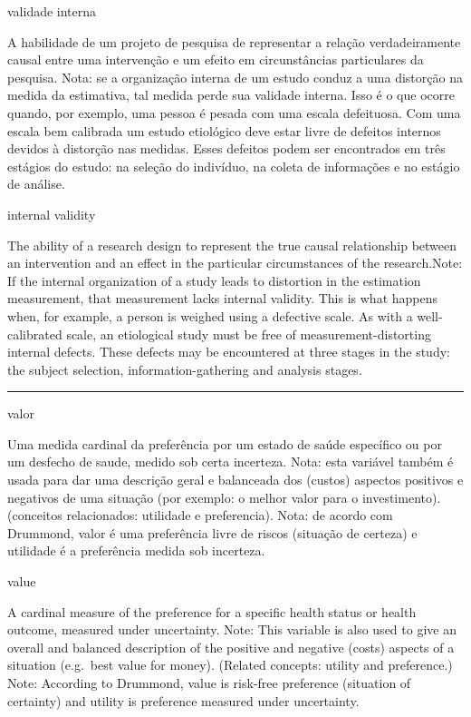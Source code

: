 \documentclass[
  openany]{book}
\begin{document}
validade interna

A habilidade de um projeto de pesquisa de representar a relação verdadeiramente causal entre uma intervenção e um efeito em circunstâncias particulares da pesquisa. Nota: se a organização interna de um estudo conduz a uma distorção na medida da estimativa, tal medida perde sua validade interna. Isso é o que ocorre quando, por exemplo, uma pessoa é pesada com uma escala defeituosa. Com uma escala bem calibrada um estudo etiológico deve estar livre de defeitos internos devidos à distorção nas medidas. Esses defeitos podem ser encontrados em três estágios do estudo: na seleção do indivíduo, na coleta de informações e no estágio de análise.

internal validity

The ability of a research design to represent the true causal relationship between an intervention and an effect in the particular circumstances of the research.Note: If the internal organization of a study leads to distortion in the estimation measurement, that measurement lacks internal validity. This is what happens when, for example, a person is weighed using a defective scale. As with a well-calibrated scale, an etiological study must be free of measurement-distorting internal defects. These defects may be encountered at three stages in the study: the subject selection, information-gathering and analysis stages.

\begin{center}\rule{0.5\linewidth}{0.5pt}\end{center}

valor

Uma medida cardinal da preferência por um estado de saúde específico ou por um desfecho de saude, medido sob certa incerteza. Nota: esta variável também é usada para dar uma descrição geral e balanceada dos (custos) aspectos positivos e negativos de uma situação (por exemplo: o melhor valor para o investimento). (conceitos relacionados: utilidade e preferencia). Nota: de acordo com Drummond, valor é uma preferência livre de riscos (situação de certeza) e utilidade é a preferência medida sob incerteza.

value

A cardinal measure of the preference for a specific health status or health outcome, measured under uncertainty. Note: This variable is also used to give an overall and balanced description of the positive and negative (costs) aspects of a situation (e.g.~best value for money). (Related concepts: utility and preference.) Note: According to Drummond, value is risk-free preference (situation of certainty) and utility is preference measured under uncertainty.
\end{document}
